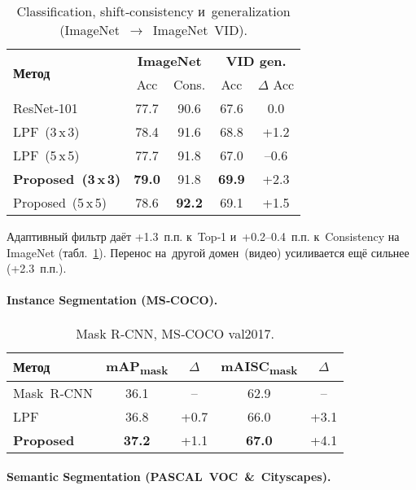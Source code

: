 \begin{table}[t]
  \centering
  \caption{Classification, shift‑consistency и generalization (ImageNet \(\rightarrow\) ImageNet VID).}
  \label{tab:imagenet_main}
  \begin{tabular}{@{}lcccc@{}}
    \toprule
    \multirow{2}{*}{\textbf{Метод}} & \multicolumn{2}{c}{\textbf{ImageNet}} & \multicolumn{2}{c}{\textbf{VID gen.}}\\
    \cmidrule(lr){2-3} \cmidrule(l){4-5}
     & Acc & Cons. & Acc & $\Delta$ Acc\\
    \midrule
    ResNet‑101 & 77.7 & 90.6 & 67.6 & 0.0\\
    LPF (3\,x\,3) & 78.4 & 91.6 & 68.8 & +1.2\\
    LPF (5\,x\,5) & 77.7 & 91.8 & 67.0 & –0.6\\
    \textbf{Proposed (3\,x\,3)} & \textbf{79.0} & 91.8 & \textbf{69.9} & +2.3\\
    Proposed (5\,x\,5) & 78.6 & \textbf{92.2} & 69.1 & +1.5\\
    \bottomrule
  \end{tabular}
\end{table}

Адаптивный фильтр даёт +1.3 п.п. к Top‑1 и +0.2–0.4 п.п. к Consistency 
на ImageNet (табл.~\ref{tab:imagenet_main}). Перенос на другой домен (видео)
усиливается ещё сильнее (+2.3 п.п.).

\paragraph{Instance Segmentation (MS‑COCO).}

\begin{table}[t]
  \centering
  \caption{Mask R‑CNN, MS‑COCO val2017.}
  \label{tab:coco}
  \begin{tabular}{@{}lcccc@{}}
    \toprule
    \textbf{Метод} & mAP\textsubscript{mask} & $\Delta$ & mAISC\textsubscript{mask} & $\Delta$\\
    \midrule
    Mask R‑CNN & 36.1 & – & 62.9 & –\\
    LPF & 36.8 & +0.7 & 66.0 & +3.1\\
    \textbf{Proposed} & \textbf{37.2} & +1.1 & \textbf{67.0} & +4.1\\
    \bottomrule
  \end{tabular}
\end{table}

\paragraph{Semantic Segmentation (PASCAL VOC \& Cityscapes).}

